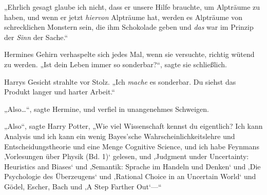 „Ehrlich gesagt glaube ich nicht, dass er unsere Hilfe brauchte, um Alpträume zu haben, und wenn er jetzt \emph{hiervon} Alpträume hat, werden es Alpträume von schrecklichen Monstern sein, die ihm Schokolade geben und \emph{das} war im Prinzip der \emph{Sinn} der Sache.“

Hermines Gehirn verhaspelte sich jedes Mal, wenn sie versuchte, richtig wütend zu werden. „Ist dein Leben immer so sonderbar?“, sagte sie schließlich.

Harrys Gesicht strahlte vor Stolz. „Ich \emph{mache} es sonderbar. Du siehst das Produkt langer und harter Arbeit.“

„Also…“, sagte Hermine, und verfiel in unangenehmes Schweigen.

„Also“, sagte Harry Potter, „Wie viel Wissenschaft kennst du eigentlich? Ich kann Analysis und ich kann ein wenig Bayes’sche Wahrscheinlichkeitslehre und Entscheidungstheorie und eine Menge Cognitive Science, und ich habe Feynmans ‚Vorlesungen über Physik (Bd. 1)‘ gelesen, und ‚Judgment under Uncertainty: Heuristics and Biases‘ und ‚Semantik: Sprache im Handeln und Denken‘ und ‚Die Psychologie des Überzeugens‘ und ‚Rational Choice in an Uncertain World‘ und Gödel, Escher, Bach und ‚A Step Farther Out‘—“%

